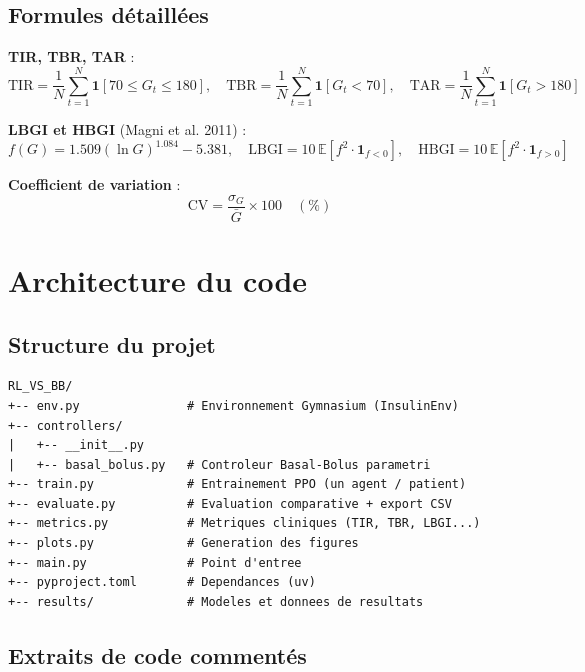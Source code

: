 \documentclass[a4paper,12pt]{report}
\begin{document}
\section{Formules détaillées}

\textbf{TIR, TBR, TAR} :
\[
  \text{TIR} = \frac{1}{N}\sum_{t=1}^{N} \mathbf{1}[70 \le G_t \le 180], \quad
  \text{TBR} = \frac{1}{N}\sum_{t=1}^{N} \mathbf{1}[G_t < 70], \quad
  \text{TAR} = \frac{1}{N}\sum_{t=1}^{N} \mathbf{1}[G_t > 180]
\]

\textbf{LBGI et HBGI} (Magni et al. 2011) :
\[
  f(G) = 1.509(\ln G)^{1.084} - 5.381, \quad
  \text{LBGI} = 10\,\mathbb{E}[f^2 \cdot \mathbf{1}_{f<0}], \quad
  \text{HBGI} = 10\,\mathbb{E}[f^2 \cdot \mathbf{1}_{f>0}]
\]

\textbf{Coefficient de variation} :
\[
  \text{CV} = \frac{\sigma_G}{\bar{G}} \times 100 \quad (\%)
\]

\newpage

\chapter{Architecture du code}

\section{Structure du projet}

\begin{tcolorbox}[mybox, title=Arborescence du dépôt]
\begin{verbatim}
RL_VS_BB/
+-- env.py               # Environnement Gymnasium (InsulinEnv)
+-- controllers/
|   +-- __init__.py
|   +-- basal_bolus.py   # Controleur Basal-Bolus parametri
+-- train.py             # Entrainement PPO (un agent / patient)
+-- evaluate.py          # Evaluation comparative + export CSV
+-- metrics.py           # Metriques cliniques (TIR, TBR, LBGI...)
+-- plots.py             # Generation des figures
+-- main.py              # Point d'entree
+-- pyproject.toml       # Dependances (uv)
+-- results/             # Modeles et donnees de resultats
\end{verbatim}
\end{tcolorbox}

\section{Extraits de code commentés}
\end{document}
